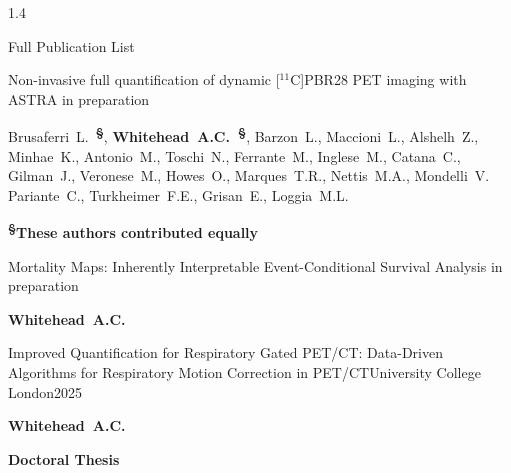 \documentclass{cv}
\begin{document}
    \begin{spacing}{1.4}
        \begin{rSection}{Full Publication List}
            \vspace{-0.5cm}
            \item \begin{rSubsection}{Non-invasive full quantification of dynamic [$^{11}$C]PBR28 PET imaging with ASTRA}{}{ }{in preparation}
                \vspace{-0.25cm}
                \item  Brusaferri~L.~\textbf{\textsuperscript{\S}}, \textbf{Whitehead~A.C.~\textsuperscript{\S}}, Barzon~L., Maccioni~L., Alshelh~Z., Minhae~K., Antonio~M., Toschi~N., Ferrante~M., Inglese~M., Catana~C., Gilman~J., Veronese~M., Howes~O., Marques~T.R., Nettis~M.A., Mondelli~V. Pariante~C., Turkheimer~F.E., Grisan~E., Loggia~M.L. \\
                \vspace{-0.5cm}
                \item \textbf{\textsuperscript{\S}These authors contributed equally} \\
            \end{rSubsection}
    
            \vspace{-0.5cm}
            \item \begin{rSubsection}{Mortality Maps: Inherently Interpretable Event-Conditional Survival Analysis}{}{ }{in preparation}
                \vspace{-0.25cm}
                \item \textbf{Whitehead~A.C.} \\
            \end{rSubsection}
    
            \vspace{-0.5cm}
            \item \begin{rSubsection}{Improved Quantification for Respiratory Gated PET/CT: Data-Driven Algorithms for Respiratory Motion Correction in PET/CT}{}{University College London}{2025}
                \vspace{-0.25cm}
                \item \textbf{Whitehead~A.C.} \\
                \vspace{-0.5cm}
                \item \textbf{Doctoral Thesis} \\
            \end{rSubsection}
    

\end{rSection}
\end{spacing}
\end{document}

